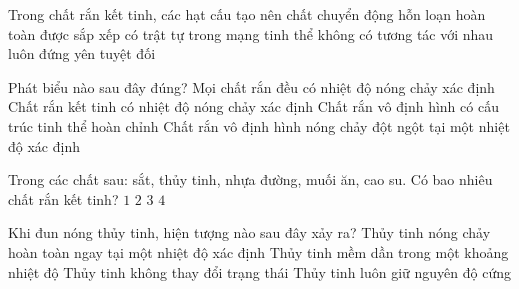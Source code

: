 \begin{ex}
Trong chất rắn kết tinh, các hạt cấu tạo nên chất
\choice
{chuyển động hỗn loạn hoàn toàn}
{\True được sắp xếp có trật tự trong mạng tinh thể}
{không có tương tác với nhau}
{luôn đứng yên tuyệt đối}
\end{ex}

\begin{ex}
Phát biểu nào sau đây đúng?
\choice
{Mọi chất rắn đều có nhiệt độ nóng chảy xác định}
{\True Chất rắn kết tinh có nhiệt độ nóng chảy xác định}
{Chất rắn vô định hình có cấu trúc tinh thể hoàn chỉnh}
{Chất rắn vô định hình nóng chảy đột ngột tại một nhiệt độ xác định}
\end{ex}





\begin{ex}
Trong các chất sau: sắt, thủy tinh, nhựa đường, muối ăn, cao su. Có bao nhiêu chất rắn kết tinh?
\choice
{$1$}
{\True $2$}
{$3$}
{$4$}
\end{ex}

\begin{ex}
Khi đun nóng thủy tinh, hiện tượng nào sau đây xảy ra?
\choice
{Thủy tinh nóng chảy hoàn toàn ngay tại một nhiệt độ xác định}
{\True Thủy tinh mềm dần trong một khoảng nhiệt độ}
{Thủy tinh không thay đổi trạng thái}
{Thủy tinh luôn giữ nguyên độ cứng}
\end{ex}

